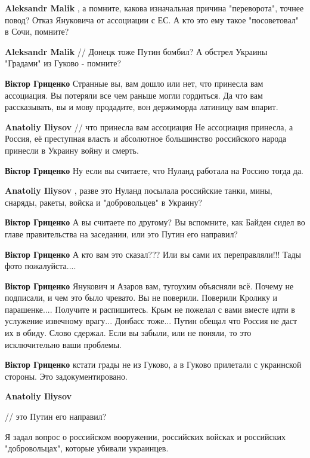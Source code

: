 \begin{itemize}
\begin{itemize}
\textbf{Aleksandr Malik} , а помните, какова изначальная причина "переворота", точнее повод? Отказ Януковича от ассоциации с ЕС.
А кто это ему такое "посоветовал" в Сочи, помните?

\textbf{Aleksandr Malik} // Донецк тоже Путин бомбил?
А обстрел Украины "Градами" из Гуково - помните?

\textbf{Віктор Гриценко} Странные вы, вам дошло или нет, что принесла вам ассоциация. Вы потеряли все чем раньше могли гордиться. Да что вам рассказывать, вы и мову продадите, вон держиморда латиницу вам впарит.

\textbf{Anatoliy Iliysov} // что принесла вам ассоциация
Не ассоциация принесла, а Россия, её преступная власть и абсолютное большинство российского народа принесли в Украину войну и смерть.

\textbf{Віктор Гриценко} Ну если вы считаете, что Нуланд работала на Россию тогда да.

\textbf{Anatoliy Iliysov} , разве это Нуланд посылала российские танки, мины, снаряды, ракеты, войска и "добровольцев" в Украину?

\textbf{Віктор Гриценко} А вы считаете по другому? Вы вспомните, как Байден сидел во главе правительства на заседании, или это Путин его направил?

\textbf{Віктор Гриценко} А кто вам это сказал??? Или вы сами их переправляли!!! Тады фото пожалуйста....

\textbf{Віктор Гриценко} Янукович и Азаров вам, тугоухим объясняли всё. Почему не подписали, и чем это было чревато. Вы не поверили. Поверили Кролику и парашенке.... Получите и распишитесь. Крым не пожелал с вами вместе идти в услужение извечному врагу... Донбасс тоже... Путин обещал что Россия не даст их в обиду. Слово сдержал. Если вы забыли, или не поняли, то это исключительно ваши проблемы.

\textbf{Віктор Гриценко} кстати грады не из Гуково, а в Гуково прилетали с украинской стороны. Это задокументировано.

\textbf{Anatoliy Iliysov} 

// это Путин его направил?

Я задал вопрос о российском вооружении, российских войсках и российских
"добровольцах", которые убивали украинцев.


\end{itemize}
\end{itemize}
